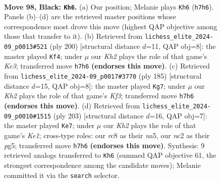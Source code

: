 \documentclass[11pt]{article}
\begin{document}
\clearpage

\begin{figure}[p]\centering
\begin{subfigure}{0.46\textwidth}\centering
\resizebox{\linewidth}{!}{%
\newchessgame
\chessboard[
  setfen={2R5/6pk/5p2/7p/7P/6PK/2Nr4/8 b - - 21 98},
  showmover=false,
  pgfstyle=straightmove, color=movearrow, markmove={h7-h6}
]}
\caption{}
\end{subfigure}\hfill
\begin{subfigure}{0.46\textwidth}\centering
\resizebox{\linewidth}{!}{%
\newchessgame
\chessboard[
  setfen={8/2R5/6pk/7p/7P/1r2KPP1/8/8 w - - 11 101},
  showmover=false,
  pgfstyle=straightmove, color=movearrow, markmove={e3-f4}
]}
\caption{}
\end{subfigure}
\\[4pt]
\begin{subfigure}{0.46\textwidth}\centering
\resizebox{\linewidth}{!}{%
\newchessgame
\chessboard[
  setfen={8/8/1R3kp1/7p/7P/6PK/r7/8 b - - 23 93},
  showmover=false,
  pgfstyle=straightmove, color=movearrow, markmove={f6-g7}
]}
\caption{}
\end{subfigure}\hfill
\begin{subfigure}{0.46\textwidth}\centering
\resizebox{\linewidth}{!}{%
\newchessgame
\chessboard[
  setfen={4k3/5p2/6p1/N2P2P1/4KP2/b7/8/8 b - - 34 102},
  showmover=false,
  pgfstyle=straightmove, color=movearrow, markmove={e8-e7}
]}
\caption{}
\end{subfigure}
\caption{\textbf{Move 98, Black: \texttt{Kh6}.} (a) Our position; Melanie plays \texttt{Kh6} (\texttt{h7h6}). Panels (b)--(d) are the retrieved master positions whose correspondence most drove this move (highest QAP objective among those that transfer to it). (b) Retrieved from \texttt{lichess\_elite\_2024-09\_p0013\#521} (ply 200) [structural distance $d$=11, QAP obj=8]: the master played \texttt{Kf4}; under $\mu$ our \emph{Kh2} plays the role of that game's \emph{Ke3}; transferred move \texttt{h7h6} \textbf{(endorses this move)}. (c) Retrieved from \texttt{lichess\_elite\_2024-09\_p0017\#3770} (ply 185) [structural distance $d$=15, QAP obj=8]: the master played \texttt{Kg7}; under $\mu$ our \emph{Kh2} plays the role of that game's \emph{Kf3}; transferred move \texttt{h7h6} \textbf{(endorses this move)}. (d) Retrieved from \texttt{lichess\_elite\_2024-09\_p0010\#1515} (ply 203) [structural distance $d$=16, QAP obj=7]: the master played \texttt{Ke7}; under $\mu$ our \emph{Kh2} plays the role of that game's \emph{Ke1}; cross-type roles: our \emph{r}c8 as their \emph{n}a5, our \emph{n}c2 as their \emph{p}g5; transferred move \texttt{h7h6} \textbf{(endorses this move)}. Synthesis: 9 retrieved analogs transferred to \texttt{Kh6} (summed QAP objective 61, the strongest correspondence among the candidate moves); Melanie committed it via the \texttt{search} selector.}
\label{fig:thought-m195}
\end{figure}
\end{document}
